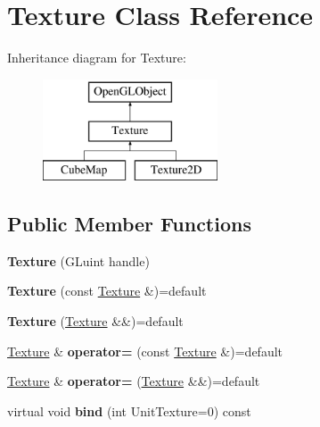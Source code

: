 \hypertarget{class_texture}{\section{Texture Class Reference}
\label{class_texture}
}
Inheritance diagram for Texture\+:\begin{figure}[H]
\begin{center}
\leavevmode
\includegraphics[height=3.000000cm]{class_texture}
\end{center}
\end{figure}
\subsection*{Public Member Functions}
\begin{DoxyCompactItemize}
\item 
\hypertarget{class_texture_ae6e2d1c971338202da0da0e43a48a2d7}{{\bfseries Texture} (G\+Luint handle)}\label{class_texture_ae6e2d1c971338202da0da0e43a48a2d7}

\item 
\hypertarget{class_texture_a045b7ee52dfedc3602549c3706b3b4aa}{{\bfseries Texture} (const \hyperlink{class_texture}{Texture} \&)=default}\label{class_texture_a045b7ee52dfedc3602549c3706b3b4aa}

\item 
\hypertarget{class_texture_a004dd9bd404d90c4be569497aa5540e1}{{\bfseries Texture} (\hyperlink{class_texture}{Texture} \&\&)=default}\label{class_texture_a004dd9bd404d90c4be569497aa5540e1}

\item 
\hypertarget{class_texture_acf93a6e7dd21616a702924ea08faf07d}{\hyperlink{class_texture}{Texture} \& {\bfseries operator=} (const \hyperlink{class_texture}{Texture} \&)=default}\label{class_texture_acf93a6e7dd21616a702924ea08faf07d}

\item 
\hypertarget{class_texture_a612e1d5344d24e0ee9a0ef4a9e876b97}{\hyperlink{class_texture}{Texture} \& {\bfseries operator=} (\hyperlink{class_texture}{Texture} \&\&)=default}\label{class_texture_a612e1d5344d24e0ee9a0ef4a9e876b97}

\item 
\hypertarget{class_texture_a8e5dd00664c3b7ce2d1b402d2cef8b45}{virtual void {\bfseries bind} (int Unit\+Texture=0) const }\label{class_texture_a8e5dd00664c3b7ce2d1b402d2cef8b45}

\end{DoxyCompactItemize}
